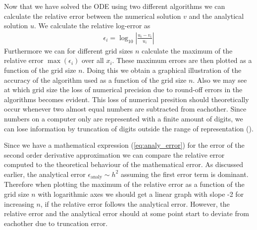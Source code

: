 \documentclass[twocolumn]{aastex62}
\begin{document}
Now that we have solved the ODE using two different algorithms we can calculate the relative error between the numerical solution $v$ and the analytical solution $u$. We calculate the relative log-error as 
\begin{align}
	\epsilon_i = \log_{10} \left|\frac{u_i - v_i}{u_i}\right|
	\label{eq:rel_error}
\end{align}
Furthermore we can for different grid sizes $n$ calculate the maximum of the relative error $\max(\epsilon_i)$ over all $x_i$. These maximum errors are then plotted as a function of the grid size $n$. Doing this we obtain a graphical illustration of the accuracy of the algorithm used as a function of the grid size $n$. Also we may see at which grid size the loss of numerical precision due to round-off errors in the algorithms becomes evident. This loss of numerical presition should theoretically occur whenever two almost equal numbers are subtracted from eachother. Since numbers on a computer only are represented with a finite amount of digits, we can lose information by truncation of digits outside the range of representation (\cite{Morken:2017}).

Since we have a mathematical expression (\ref{eq:analy_error}) for the error of the second order derivative approximation we can compare the relative error computed to the theoretical behaviour of the mathematical error. As discussed earlier, the analytical error $\epsilon_\text{analy} \sim h^2$ assuming the first error term is dominant. Therefore when plotting the maximum of the relative error as a function of the grid size $n$ with logarithmic axes we should get a linear graph with slope -2 for increasing $n$, if the relative error follows the analytical error. However, the relative error and the analytical error should at some point start to deviate from eachother due to truncation error. 
\end{document}
